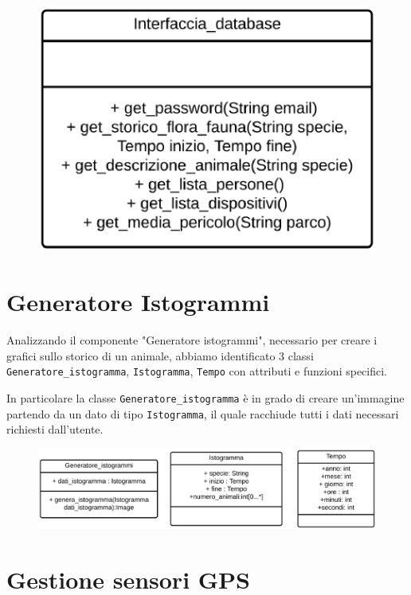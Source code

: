 \begin{figure}[ht]
    \centering
    \includegraphics[scale=0.35]{Img/ClassDataBase.eps}
\end{figure}

\section{Generatore Istogrammi}
Analizzando il componente "Generatore istogrammi", necessario per creare i grafici sullo storico di un animale, abbiamo identificato 3 classi \texttt{Generatore\_istogramma}, \texttt{Istogramma}, \texttt{Tempo} con attributi e funzioni specifici.

In particolare la classe \texttt{Generatore\_istogramma} è in grado di creare un'immagine partendo da un dato di tipo \texttt{Istogramma}, il quale racchiude tutti i dati necessari richiesti dall'utente.

\begin{figure}[ht]
    \centering
    \includegraphics[scale=0.4]{Img/ClassIstogramma.eps}
\end{figure}

\section{Gestione sensori GPS}

